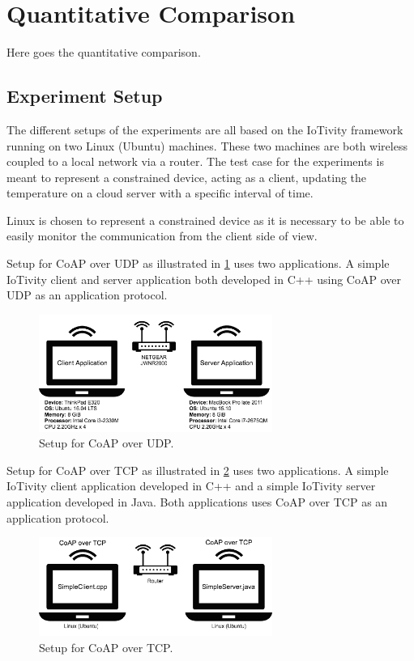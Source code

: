 \section{Quantitative Comparison}
Here goes the quantitative comparison.

\subsection{Experiment Setup}
The different setups of the experiments are all based on the IoTivity framework running on two Linux (Ubuntu) machines. These two machines are both wireless coupled to a local network via a router. The test case for the experiments is meant to represent a constrained device, acting as a client, updating the temperature on a cloud server with a specific interval of time. 

Linux is chosen to represent a constrained device as it is necessary to be able to easily monitor the communication from the client side of view.

Setup for CoAP over UDP as illustrated in \figurename \ref{fig:setupudp} uses two applications. A simple IoTivity client and server application both developed in C++ using CoAP over UDP as an application protocol.
\begin{figure}[!t]
	\centering
	\includegraphics[width=3in]{gfx/setupa}
	\caption{Setup for CoAP over UDP.}
	\label{fig:setupudp}
\end{figure}

Setup for CoAP over TCP as illustrated in \figurename \ref{fig:setuptcp} uses two applications. A simple IoTivity client application developed in C++ and a simple IoTivity server application developed in Java. Both applications uses CoAP over TCP as an application protocol.
\begin{figure}[!t]
	\centering
	\includegraphics[width=3in]{gfx/setupb}
	\caption{Setup for CoAP over TCP.}
	\label{fig:setuptcp}
\end{figure}

